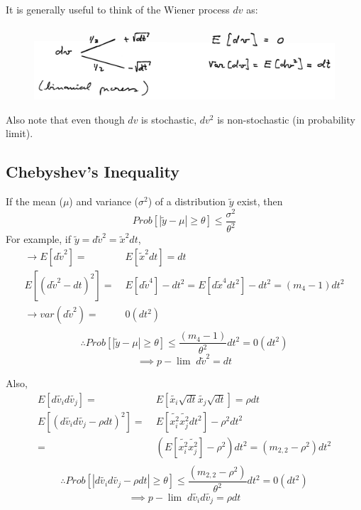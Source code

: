 \documentclass[
14pt,notheorems,hyperref={pdfauthor=whatever}
]{beamer}
\begin{document}
\begin{frame}
It is generally useful to think of the Wiener process $dv$ as:\\
\begin{figure}[diffusion]
    \includegraphics[width=1\textwidth]{images/L8-wiener.png}
    \centering
\end{figure}
Also note that even though $dv$ is stochastic, $dv^2$ is non-stochastic (in probability limit).
\end{frame}


\subsection{Chebyshev's Inequality}
\begin{frame}
If the mean ($\mu$) and variance ($\sigma^2$) of a distribution $\tilde{y}$ exist, then\\
\[Prob[|\tilde y - \mu| \geq \theta] \leq \frac{\sigma^2}{\theta^2}\]
For example, if $\tilde{y} = d\tilde{v}^2 = \tilde x^2 dt$,\\
\begin{align*}
    \longrightarrow E[d\tilde{v}^2] =&\; E[\tilde{x}^2 dt] = dt\\
    E[(d\tilde{v}^2 - dt)^2] =&\; E[d\tilde{v}^4] - dt^2 = E[d\tilde{x}^4 dt^2] - dt^2 = (m_4 - 1)dt^2\\
    \longrightarrow var(d\tilde{v}^2) =&\; 0 (dt^2)\\
\end{align*}
\[\therefore Prob[|\tilde y - \mu| \geq \theta] \leq \frac{(m_4-1)}{\theta^2}dt^2 = 0(dt^2)\]
\[\implies {p\!\!-\!\!\lim}\; d\tilde{v}^2 = dt\]
\end{frame}

\begin{frame}
Also,\\
\begin{align*}
    E[d\tilde{v_i}d\tilde{v_j}] =&\; E[\tilde{x_i}\sqrt{dt}\tilde{x_j}\sqrt{dt}] = \rho dt\\
    E[(d\tilde{v_i}d\tilde{v_j}-\rho dt)^2] =&\; E[\tilde{x_i^2}\tilde{x_j^2}dt^2]-\rho^2 dt^2\\
    =&\; (E[\tilde{x_i^2}\tilde{x_j^2}]-\rho^2) dt^2 = (m_{2,2}-\rho^2)dt^2\\
\end{align*}
\[\therefore Prob[|d\tilde{v_i}d\tilde{v_j} - \rho dt| \geq \theta] \leq \frac{(m_{2,2}-\rho^2)}{\theta^2}dt^2 = 0(dt^2)\]
\[\implies {p\!\!-\!\!\lim}\; d\tilde{v_i}d\tilde{v_j} = \rho dt\]
\end{frame}
\end{document}
